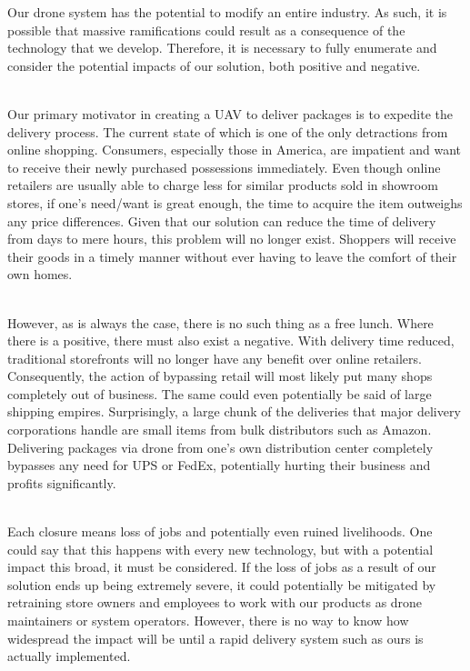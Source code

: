 \documentclass[12pt]{extarticle}
\begin{document}
Our drone system has the potential to modify an entire industry.  As such, it is possible that massive ramifications could result as a consequence of the technology that we develop.  Therefore, it is necessary to fully enumerate and consider the potential impacts of our solution, both positive and negative.  

\ \\
Our primary motivator in creating a UAV to deliver packages is to expedite the delivery process.  The current state of which is one of the only detractions from online shopping.  Consumers, especially those in America, are impatient and want to receive their newly purchased possessions immediately.  Even though online retailers are usually able to charge less for similar products sold in showroom stores, if one's need/want is great enough, the time to acquire the item outweighs any price differences.  Given that our solution can reduce the time of delivery from days to mere hours, this problem will no longer exist.  Shoppers will receive their goods in a timely manner without ever having to leave the comfort of their own homes.  

\ \\
However, as is always the case, there is no such thing as a free lunch.  Where there is a positive, there must also exist a negative.  With delivery time reduced, traditional storefronts will no longer have any benefit over online retailers.  Consequently, the action of bypassing retail will most likely put many shops completely out of business.  The same could even potentially be said of large shipping empires.  Surprisingly, a large chunk of the deliveries that major delivery corporations handle are small items from bulk distributors such as Amazon.  Delivering packages via drone from one's own distribution center completely bypasses any need for UPS or FedEx, potentially hurting their business and profits significantly.

\ \\
Each closure means loss of jobs and potentially even ruined livelihoods.  One could say that this happens with every new technology, but with a potential impact this broad, it must be considered.  If the loss of jobs as a result of our solution ends up being extremely severe, it could potentially be mitigated by retraining store owners and employees to work with our products as drone maintainers or system operators.  However, there is no way to know how widespread the impact will be until a rapid delivery system such as ours is actually implemented.  
\end{document}
